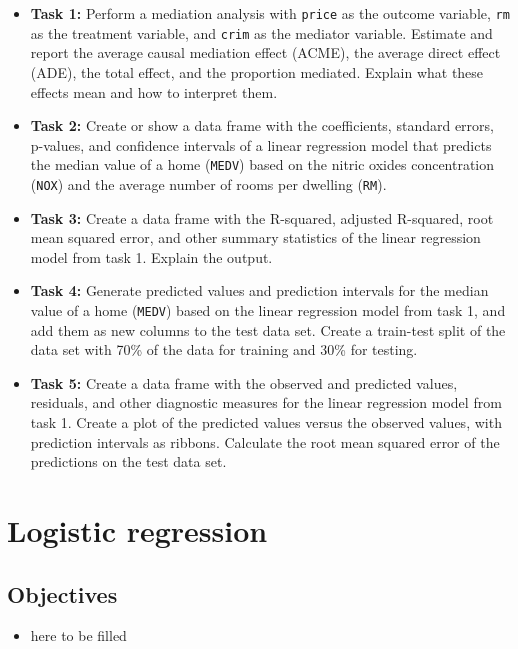 \documentclass[
]{book}
\providecommand{\tightlist}{%
  \setlength{\itemsep}{0pt}\setlength{\parskip}{0pt}}
\begin{document}
\begin{itemize}
\item
  \textbf{Task 1:} Perform a mediation analysis with \texttt{price} as the outcome variable, \texttt{rm} as the treatment variable, and \texttt{crim} as the mediator variable. Estimate and report the average causal mediation effect (ACME), the average direct effect (ADE), the total effect, and the proportion mediated. Explain what these effects mean and how to interpret them.
\item
  \textbf{Task 2:} Create or show a data frame with the coefficients, standard errors, p-values, and confidence intervals of a linear regression model that predicts the median value of a home (\texttt{MEDV}) based on the nitric oxides concentration (\texttt{NOX}) and the average number of rooms per dwelling (\texttt{RM}).
\item
  \textbf{Task 3:} Create a data frame with the R-squared, adjusted R-squared, root mean squared error, and other summary statistics of the linear regression model from task 1. Explain the output.
\item
  \textbf{Task 4:} Generate predicted values and prediction intervals for the median value of a home (\texttt{MEDV}) based on the linear regression model from task 1, and add them as new columns to the test data set. Create a train-test split of the data set with 70\% of the data for training and 30\% for testing.
\item
  \textbf{Task 5:} Create a data frame with the observed and predicted values, residuals, and other diagnostic measures for the linear regression model from task 1. Create a plot of the predicted values versus the observed values, with prediction intervals as ribbons. Calculate the root mean squared error of the predictions on the test data set.
\end{itemize}

\hypertarget{log-est}{%
\chapter{Logistic regression}\label{log-est}}

\hypertarget{objectives-9}{%
\section{Objectives}\label{objectives-9}}

\begin{itemize}
\tightlist
\item
  here to be filled
\end{itemize}
\end{document}

